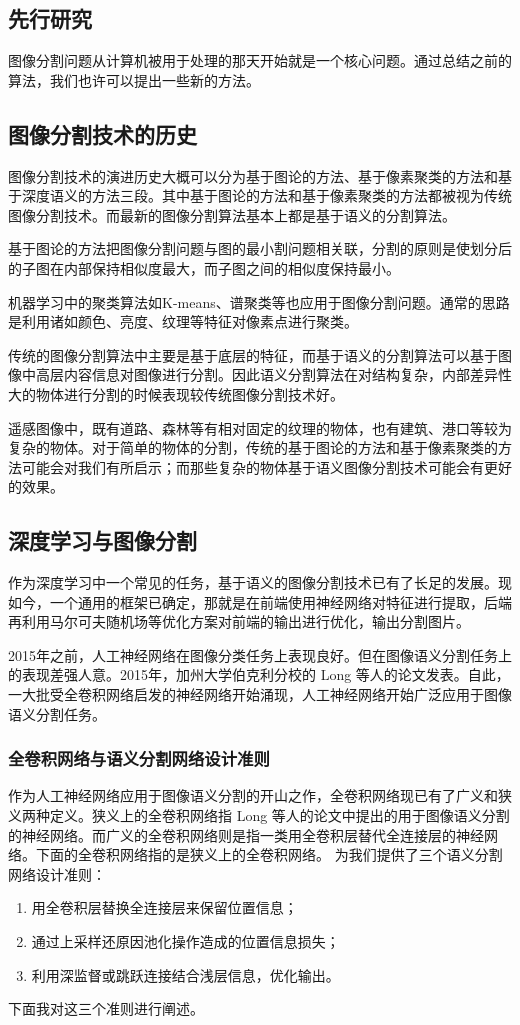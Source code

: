 \begin{spacing}{2}
    \section{先行研究}
\end{spacing}
图像分割问题从计算机被用于处理的那天开始就是一个核心问题。通过总结之前的算法，我们也许可以提出一些新的方法。
\subsection{图像分割技术的历史}
图像分割技术的演进历史大概可以分为基于图论的方法、基于像素聚类的方法和基于深度语义的方法三段。其中基于图论的方法和基于像素聚类的方法都被视为传统图像分割技术。而最新的图像分割算法基本上都是基于语义的分割算法。

基于图论的方法把图像分割问题与图的最小割问题相关联，分割的原则是使划分后的子图在内部保持相似度最大，而子图之间的相似度保持最小。

机器学习中的聚类算法如K-means、谱聚类等也应用于图像分割问题。通常的思路是利用诸如颜色、亮度、纹理等特征对像素点进行聚类。

传统的图像分割算法中主要是基于底层的特征，而基于语义的分割算法可以基于图像中高层内容信息对图像进行分割。因此语义分割算法在对结构复杂，内部差异性大的物体进行分割的时候表现较传统图像分割技术好。

遥感图像中，既有道路、森林等有相对固定的纹理的物体，也有建筑、港口等较为复杂的物体。对于简单的物体的分割，传统的基于图论的方法和基于像素聚类的方法可能会对我们有所启示；而那些复杂的物体基于语义图像分割技术可能会有更好的效果。
\subsection{深度学习与图像分割}
作为深度学习中一个常见的任务，基于语义的图像分割技术已有了长足的发展。现如今，一个通用的框架已确定，那就是在前端使用神经网络对特征进行提取，后端再利用马尔可夫随机场等优化方案对前端的输出进行优化，输出分割图片。

2015年之前，人工神经网络在图像分类任务上表现良好。但在图像语义分割任务上的表现差强人意。2015年，加州大学伯克利分校的 Long 等人的论文\cite{long2015fully}发表。自此，一大批受全卷积网络启发的神经网络开始涌现，人工神经网络开始广泛应用于图像语义分割任务。
\subsubsection {全卷积网络与语义分割网络设计准则}
作为人工神经网络应用于图像语义分割的开山之作，全卷积网络现已有了广义和狭义两种定义。狭义上的全卷积网络指 Long 等人的论文\cite{long2015fully}中提出的用于图像语义分割的神经网络。而广义的全卷积网络则是指一类用全卷积层替代全连接层的神经网络。下面的全卷积网络指的是狭义上的全卷积网络。
\cite{long2015fully}为我们提供了三个语义分割网络设计准则：
\begin{enumerate}
    \item 用全卷积层替换全连接层来保留位置信息；
    \item 通过上采样还原因池化操作造成的位置信息损失；
    \item 利用深监督或跳跃连接结合浅层信息，优化输出。
\end{enumerate}
下面我对这三个准则进行阐述。
